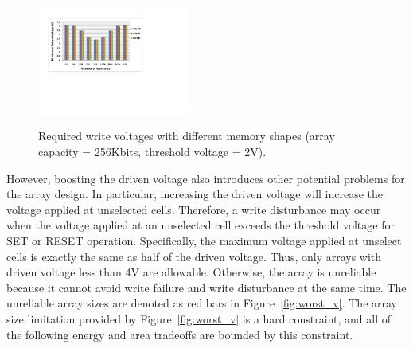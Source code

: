 \begin{figure}%
\centering
  \includegraphics[width=0.45\textwidth]{./figures/shape_f.pdf}\\
  \caption{Required write voltages with different memory shapes (array capacity = 256Kbits, threshold voltage = 2V).}\label{fig:shape}
    \vspace{-15pt}
\end{figure}

However, boosting the driven voltage also introduces other potential
problems for the array design. In particular, increasing the driven voltage will
increase the voltage applied at unselected cells. Therefore, a write
disturbance may occur when the voltage applied at an unselected cell
exceeds the threshold voltage for SET or RESET operation. Specifically,
the maximum voltage applied at unselect cells is exactly the same as half
of the driven voltage. Thus, only arrays with driven voltage less than 4V
are allowable. Otherwise, the array is unreliable because it cannot avoid
write failure and write disturbance at the same time. The unreliable array
sizes are denoted as red bars in Figure~\ref{fig:worst_v}. The array size
limitation provided by Figure~\ref{fig:worst_v} is a hard constraint, and
all of the following energy and area tradeoffs are bounded by this
constraint.






